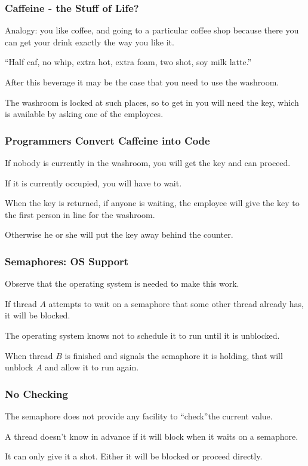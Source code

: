 \begin{frame}
\frametitle{Caffeine - the Stuff of Life?}

Analogy: you like coffee, and going to a particular coffee shop because there you can get your drink exactly the way you like it.

``Half caf, no whip, extra hot, extra foam, two shot, soy milk latte.''

After this beverage it may be the case that you need to use the washroom. 

The washroom is locked at such places, so to get in you will need the key, which is available by asking one of the employees. 

\end{frame}

\begin{frame}
\frametitle{Programmers Convert Caffeine into Code}

If nobody is currently in the washroom, you will get the key and can proceed. 

If it is currently occupied, you will have to wait. 

When the key is returned, if anyone is waiting, the employee will give the key to the first person in line for the washroom. 

Otherwise he or she will put the key away behind the counter.


\end{frame}

\begin{frame}
\frametitle{Semaphores: OS Support}

Observe that the operating system is needed to make this work. 

If thread $A$ attempts to wait on a semaphore that some other thread already has, it will be blocked. 

The operating system knows not to schedule it to run until it is unblocked. 

When thread $B$ is finished and signals the semaphore it is holding, that will unblock $A$ and allow it to run again.


\end{frame}

\begin{frame}
\frametitle{No Checking}


The semaphore does not provide any facility to ``check''the current value. 

A thread doesn't know in advance if it will block when it waits on a semaphore.

It can only give it a shot. Either it will be blocked or proceed directly.

\end{frame}


